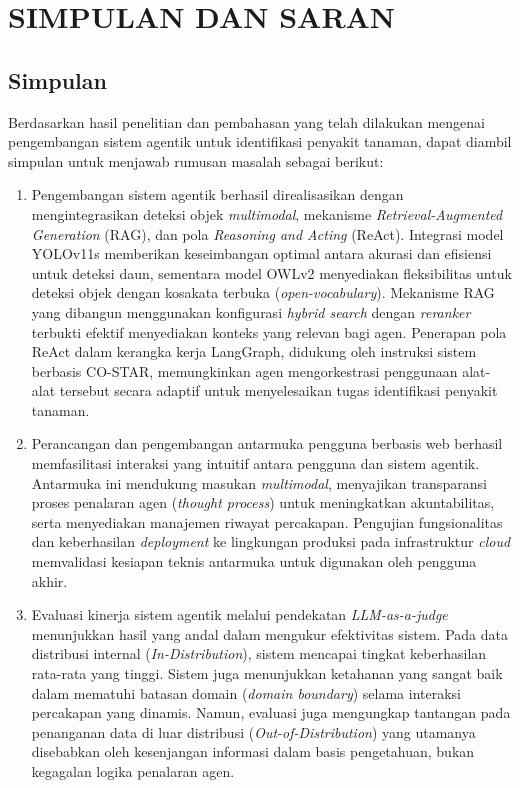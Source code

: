 \chapter{SIMPULAN DAN SARAN}

\section{Simpulan}
Berdasarkan hasil penelitian dan pembahasan yang telah dilakukan mengenai pengembangan sistem agentik untuk identifikasi penyakit tanaman, dapat diambil simpulan untuk menjawab rumusan masalah sebagai berikut:

\begin{enumerate}[nosep]
    \item Pengembangan sistem agentik berhasil direalisasikan dengan mengintegrasikan deteksi objek \textit{multimodal}, mekanisme \textit{Retrieval-Augmented Generation} (RAG), dan pola \textit{Reasoning and Acting} (ReAct). Integrasi model YOLOv11s memberikan keseimbangan optimal antara akurasi dan efisiensi untuk deteksi daun, sementara model OWLv2 menyediakan fleksibilitas untuk deteksi objek dengan kosakata terbuka (\textit{open-vocabulary}). Mekanisme RAG yang dibangun menggunakan konfigurasi \textit{hybrid search} dengan \textit{reranker} terbukti efektif menyediakan konteks yang relevan bagi agen. Penerapan pola ReAct dalam kerangka kerja LangGraph, didukung oleh instruksi sistem berbasis CO-STAR, memungkinkan agen mengorkestrasi penggunaan alat-alat tersebut secara adaptif untuk menyelesaikan tugas identifikasi penyakit tanaman.
    \item Perancangan dan pengembangan antarmuka pengguna berbasis web berhasil memfasilitasi interaksi yang intuitif antara pengguna dan sistem agentik. Antarmuka ini mendukung masukan \textit{multimodal}, menyajikan transparansi proses penalaran agen (\textit{thought process}) untuk meningkatkan akuntabilitas, serta menyediakan manajemen riwayat percakapan. Pengujian fungsionalitas dan keberhasilan \textit{deployment} ke lingkungan produksi pada infrastruktur \textit{cloud} memvalidasi kesiapan teknis antarmuka untuk digunakan oleh pengguna akhir.
    \item Evaluasi kinerja sistem agentik melalui pendekatan \textit{LLM-as-a-judge} menunjukkan hasil yang andal dalam mengukur efektivitas sistem. Pada data distribusi internal (\textit{In-Distribution}), sistem mencapai tingkat keberhasilan rata-rata yang tinggi. Sistem juga menunjukkan ketahanan yang sangat baik dalam mematuhi batasan domain (\textit{domain boundary}) selama interaksi percakapan yang dinamis. Namun, evaluasi juga mengungkap tantangan pada penanganan data di luar distribusi (\textit{Out-of-Distribution}) yang utamanya disebabkan oleh kesenjangan informasi dalam basis pengetahuan, bukan kegagalan logika penalaran agen.
\end{enumerate}

